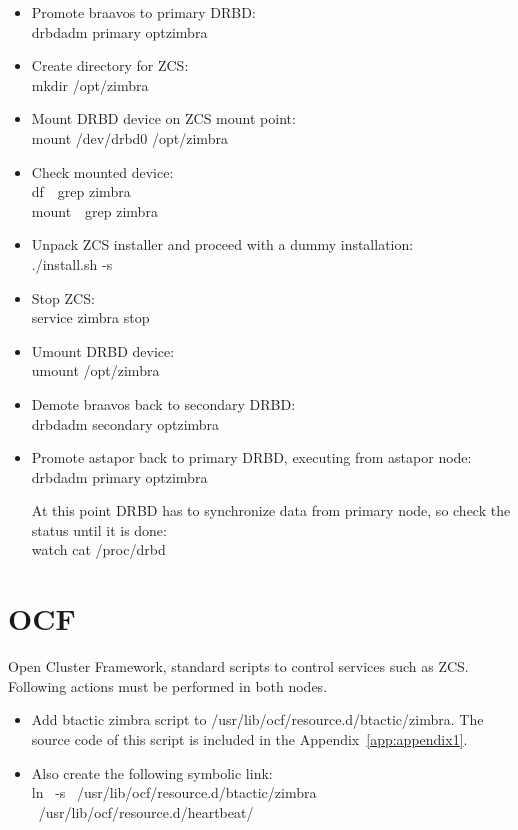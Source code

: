 \documentclass[a4paper, 12pt]{book}
\begin{document}
\begin{itemize}
	\item Promote braavos to primary DRBD:\\
		drbdadm primary optzimbra
		
	\item Create directory for ZCS:\\
		mkdir   /opt/zimbra
		
	\item Mount DRBD device on ZCS mount point:\\
		mount   /dev/drbd0   /opt/zimbra
	
	\item Check mounted device:\\
		df\  \textbar \ grep zimbra\\
		mount\  \textbar \ grep zimbra
		
	\item Unpack ZCS installer and proceed with a dummy installation:\\
		./install.sh -s
		
	\item Stop ZCS:\\
		service zimbra stop
	
	\item Umount DRBD device:\\
		umount   /opt/zimbra
		
	\item Demote braavos back to secondary DRBD:\\
		drbdadm secondary optzimbra
		
	\item Promote astapor back to primary DRBD, executing from astapor node:\\
		drbdadm primary optzimbra
		
\noindent At this point DRBD has to synchronize data from primary node, so check the status until it is done:\\
	watch cat /proc/drbd
	
\end{itemize}

\section{OCF}
\label{sec:ocf}

\noindent Open Cluster Framework, standard scripts to control services such as ZCS. Following actions must be performed in both nodes.

\begin{itemize}
	\item Add btactic zimbra script to /usr/lib/ocf/resource.d/btactic/zimbra. The source code of this script is included in the Appendix~\ref{app:appendix1}.\\

	\item Also create the following symbolic link:\\
		ln \ -s \ /usr/lib/ocf/resource.d/btactic/zimbra \ /usr/lib/ocf/resource.d/heartbeat/
\end{itemize}
\end{document}
